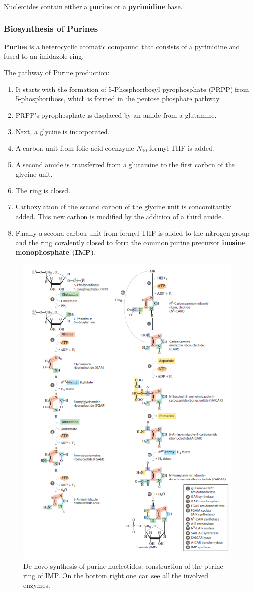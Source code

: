 \documentclass[../main.tex]{subfiles}
\begin{document}
Nucleotides contain either a \textbf{purine} or a \textbf{pyrimidine} base.  

\subsubsection{Biosynthesis of Purines}

\textbf{\gls{Purine}} is a heterocyclic aromatic compound that consists of a pyrimidine and fused to an imidazole ring.

The pathway of Purine production:
\begin{enumerate}
	\item It starts with the formation of 5-Phosphoribosyl pyrophosphate (PRPP) from 5-phosphoribose, which is formed in the pentose phosphate pathway.
	\item PRPP's pyrophosphate is displaced by an amide from a glutamine.
	\item Next, a glycine is incorporated.
	\item A carbon unit from folic acid coenzyme $N_{10}$-formyl-THF is added.
	\item A second amide is transferred from a glutamine to the first carbon of the glycine unit.
	\item The ring is closed.
	\item Carboxylation of the second carbon of the glycine unit is concomitantly added. This new carbon is modified by the addition of a third amide.
	\item Finally a second carbon unit from formyl-THF is added to the nitrogen group and the ring covalently closed to form the common purine precursor \textbf{\gls{inosine monophosphate (IMP)}}.
\end{enumerate} 

\begin{figure}[H]
	\centering
	\includegraphics[width=0.6\linewidth]{puri_path1}
	\caption{De novo synthesis of purine nucleotides: construction of the purine ring of IMP. On the bottom right one can see all the involved enzymes.}
	\label{fig:puripath1}
\end{figure}
\end{document}

